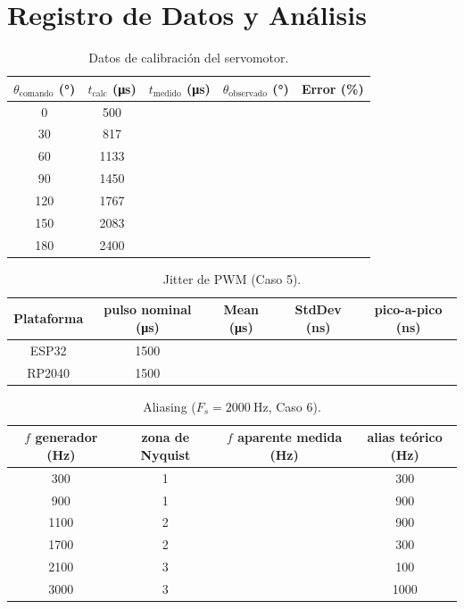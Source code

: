 \documentclass[11pt]{article}
\begin{document}
\section{Registro de Datos y Análisis}

\begin{table}[H]\centering
\caption{Datos de calibración del servomotor.}
\begin{tabular}{ccccc}
\toprule
$\theta_\text{comando}$ (\si{\degree}) & $t_\text{calc}$ (\si{\micro\second}) &
$t_\text{medido}$ (\si{\micro\second}) & $\theta_\text{observado}$ (\si{\degree}) & Error (\%) \\
\midrule
0   & 500  & & & \\
30  & 817  & & & \\
60  & 1133 & & & \\
90  & 1450 & & & \\
120 & 1767 & & & \\
150 & 2083 & & & \\
180 & 2400 & & & \\
\bottomrule
\end{tabular}
\end{table}

\begin{table}[H]\centering
\caption{Jitter de PWM (Caso 5).}
\begin{tabular}{ccccc}
\toprule
Plataforma & pulso nominal (\si{\micro\second}) & Mean (\si{\micro\second}) &
StdDev (\si{\nano\second}) & pico-a-pico (\si{\nano\second}) \\
\midrule
ESP32  & 1500 & & & \\
RP2040 & 1500 & & & \\
\bottomrule
\end{tabular}
\end{table}

\begin{table}[H]\centering
\caption{Aliasing ($F_s = \SI{2000}{\hertz}$, Caso 6).}
\begin{tabular}{cccc}
\toprule
$f$ generador (Hz) & zona de Nyquist & $f$ aparente medida (Hz) & alias teórico (Hz) \\
\midrule
300  & 1 & & 300 \\
900  & 1 & & 900 \\
1100 & 2 & & 900 \\
1700 & 2 & & 300 \\
2100 & 3 & & 100 \\
3000 & 3 & & 1000 \\
\bottomrule
\end{tabular}
\end{table}
\end{document}
